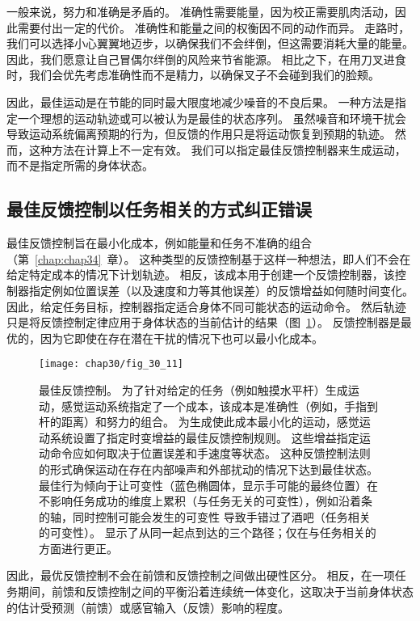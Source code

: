 一般来说，努力和准确是矛盾的。
准确性需要能量，因为校正需要肌肉活动，因此需要付出一定的代价。
准确性和能量之间的权衡因不同的动作而异。
走路时，我们可以选择小心翼翼地迈步，以确保我们不会绊倒，但这需要消耗大量的能量。
因此，我们愿意让自己冒偶尔绊倒的风险来节省能源。
相比之下，在用刀叉进食时，我们会优先考虑准确性而不是精力，以确保叉子不会碰到我们的脸颊。


因此，最佳运动是在节能的同时最大限度地减少噪音的不良后果。
一种方法是指定一个理想的运动轨迹或可以被认为是最佳的状态序列。
虽然噪音和环境干扰会导致运动系统偏离预期的行为，但反馈的作用只是将运动恢复到预期的轨迹。
然而，这种方法在计算上不一定有效。
我们可以指定最佳反馈控制器来生成运动，而不是指定所需的身体状态。



\subsection{最佳反馈控制以任务相关的方式纠正错误}

最佳反馈控制旨在最小化成本，例如能量和任务不准确的组合（第~\ref{chap:chap34}~章）。
这种类型的反馈控制基于这样一种想法，即人们不会在给定特定成本的情况下计划轨迹。
相反，该成本用于创建一个反馈控制器，该控制器指定例如位置误差（以及速度和力等其他误差）的反馈增益如何随时间变化。
因此，给定任务目标，控制器指定适合身体不同可能状态的运动命令。
然后轨迹只是将反馈控制定律应用于身体状态的当前估计的结果（图~\ref{fig:30_11}）。
反馈控制器是最优的，因为它即使在存在潜在干扰的情况下也可以最小化成本。


\begin{figure}[htbp]
	\centering
	\texttt{[image: chap30/fig\_30\_11]}
	\caption{最佳反馈控制。
		为了针对给定的任务（例如触摸水平杆）生成运动，感觉运动系统指定了一个成本，该成本是准确性（例如，手指到杆的距离）和努力的组合。
		为生成使此成本最小化的运动，感觉运动系统设置了指定时变增益的最佳反馈控制规则。
		这些增益指定运动命令应如何取决于位置误差和手速度等状态。
		这种反馈控制法则的形式确保运动在存在内部噪声和外部扰动的情况下达到最佳状态。
		最佳行为倾向于让可变性（蓝色椭圆体，显示手可能的最终位置）在不影响任务成功的维度上累积（与任务无关的可变性），例如沿着条的轴，同时控制可能会发生的可变性 导致手错过了酒吧（任务相关的可变性）。
		显示了从同一起点到达的三个路径；仅在与任务相关的方面进行更正。}
	\label{fig:30_11}
\end{figure}


因此，最优反馈控制不会在前馈和反馈控制之间做出硬性区分。
相反，在一项任务期间，前馈和反馈控制之间的平衡沿着连续统一体变化，这取决于当前身体状态的估计受预测（前馈）或感官输入（反馈）影响的程度。


